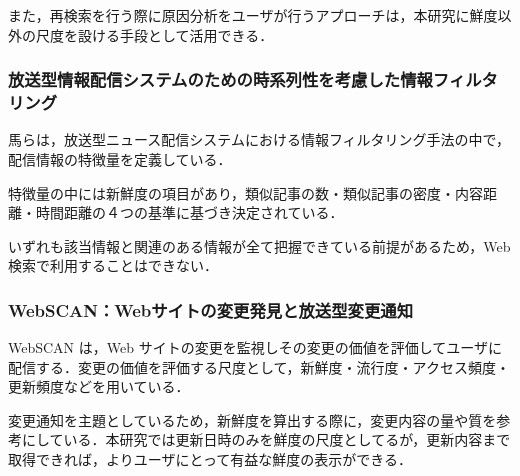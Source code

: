 また，再検索を行う際に原因分析をユーザが行うアプローチは，本研究に鮮度以外の尺度を設ける手段として活用できる．

\subsubsection{放送型情報配信システムのための時系列性を考慮した情報フィルタリング}

馬\cite{filtersystem}らは，放送型ニュース配信システムにおける情報フィルタリング手法の中で，配信情報の特徴量を定義している．

特徴量の中には新鮮度の項目があり，類似記事の数・類似記事の密度・内容距離・時間距離の４つの基準に基づき決定されている．

いずれも該当情報と関連のある情報が全て把握できている前提があるため，Web 検索で利用することはできない．

\subsubsection{WebSCAN：Webサイトの変更発見と放送型変更通知}

WebSCAN\cite{webscan} は，Web サイトの変更を監視しその変更の価値を評価してユーザに配信する．変更の価値を評価する尺度として，新鮮度・流行度・アクセス頻度・更新頻度などを用いている．

変更通知を主題としているため，新鮮度を算出する際に，変更内容の量や質を参考にしている．本研究では更新日時のみを鮮度の尺度としてるが，更新内容まで取得できれば，よりユーザにとって有益な鮮度の表示ができる．
